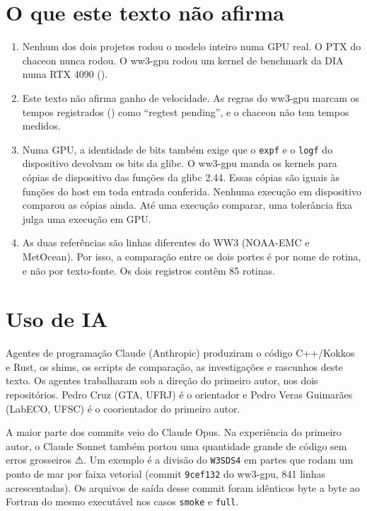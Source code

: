 \documentclass[10pt,a4paper,]{article}
\providecommand{\tightlist}{\setlength{\itemsep}{0pt}\setlength{\parskip}{0pt}}
\begin{document}
\section{O que este texto não afirma}\label{sec:limits}

\begin{enumerate}
\def\labelenumi{\arabic{enumi}.}
\tightlist
\item
  Nenhum dos dois projetos rodou o modelo inteiro numa GPU real. O PTX
  do chaceon nunca rodou. O ww3-gpu rodou um kernel de benchmark da DIA
  numa RTX 4090 ().
\item
  Este texto não afirma ganho de velocidade. As regras do ww3-gpu marcam
  os tempos registrados () como
  ``regtest pending'', e o chaceon não tem tempos medidos.
\item
  Numa GPU, a identidade de bits também exige que o \texttt{expf} e o
  \texttt{logf} do dispositivo devolvam os bits da glibc. O ww3-gpu
  manda os kernels para cópias de dispositivo das funções da glibc 2.44.
  Essas cópias são iguais às funções do host em toda entrada conferida.
  Nenhuma execução em dispositivo comparou as cópias ainda. Até uma
  execução comparar, uma tolerância fixa julga uma execução em GPU.
\item
  As duas referências são linhas diferentes do WW3 (NOAA-EMC e
  MetOcean). Por isso, a comparação entre os dois portes é por nome de
  rotina, e não por texto-fonte. Os dois registros contêm 85 rotinas.
\end{enumerate}

\section{Uso de IA}\label{sec:ai}

Agentes de programação Claude (Anthropic) produziram o código C++/Kokkos
e Rust, os shims, os scripts de comparação, as investigações e rascunhos
deste texto. Os agentes trabalharam sob a direção do primeiro autor, nos
dois repositórios. Pedro Cruz (GTA, UFRJ) é o orientador e Pedro Veras
Guimarães (LabECO, UFSC) é o coorientador do primeiro autor.

A maior parte dos commits veio do Claude Opus. Na experiência do
primeiro autor, o Claude Sonnet também portou uma quantidade grande de
código sem erros grosseiros ⚠. Um exemplo é a divisão do \texttt{W3SDS4}
em partes que rodam um ponto de mar por faixa vetorial (commit
\texttt{9cef132} do ww3-gpu, 841 linhas acrescentadas). Os arquivos de
saída desse commit foram idênticos byte a byte ao Fortran do mesmo
executável nos casos \texttt{smoke} e \texttt{full}.
\end{document}
